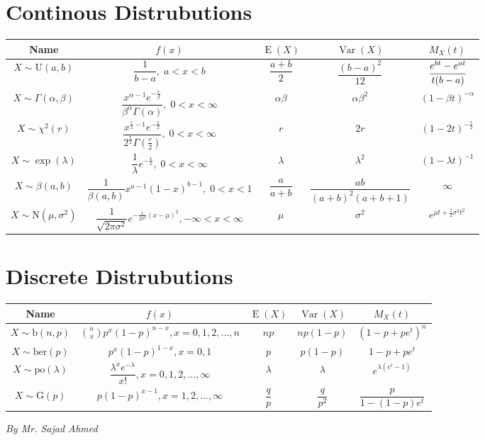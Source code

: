 \documentclass[14pt]{extarticle}
\DeclareMathOperator{\E}{E}
\DeclareMathOperator{\Var}{Var}
\begin{document}
\pagestyle{empty}
\section*{Continous Distrubutions}
\begin{center}
\begin{tabular}{|c|c|c|c|c|}
	\hline 
	Name & \(f(x)\) & \(\E(X)\) & \(\Var(X)\) & \(M_X(t)\) \\
	\hline
	\(X \sim \text{U}(a, b)\) & \(\dfrac{1}{b-a}, \; a < x < b\) & \(\dfrac{a+b}{2}\) & \(\dfrac{(b-a)^2}{12}\) & \(\cfrac{e^{bt} - e^{at}}{t(b-a)}\)\\
	\hline 
	\(X\sim \Gamma(\alpha, \beta)\) & \(\dfrac{x^{\alpha-1}e^{-\frac{x}{\beta}}}{\beta^\alpha \Gamma(\alpha)}, \; 0<x<\infty\) & \(\alpha\beta\) & \(\alpha\beta^2\) & \((1-\beta t)^{-\alpha}\) \\
	\hline
	\(X\sim \chi^2(r)\) & \(\dfrac{x^{\frac{r}{2}-1}e^{-\frac{x}{2}}}{2^{\frac{r}{2}}\Gamma(\frac{r}{2})}, \; 0<x<\infty\) & \(r\) & \(2r\) & \((1-2t)^{-\frac{r}{2}}\)\\
	\hline
	\(X\sim \exp(\lambda)\) & \(\dfrac{1}{\lambda} e^{-\frac{x}{\lambda}}, \; 0<x<\infty\) & \(\lambda\) & \(\lambda^2\) & \((1-\lambda t)^{-1}\)\\
	\hline
	\(X\sim \beta(a, b)\) & \(\dfrac{1}{\beta(a, b)} x^{a-1}(1-x)^{b-1}, \; 0<x<1\) & \(\dfrac{a}{a+b}\) & \(\dfrac{ab}{(a+b)^2(a+b+1)}\) & \(\infty\) \\
	\hline
	\(X\sim \text{N}(\mu, \sigma^2)\) & \(\dfrac{1}{\sqrt{2\pi \sigma^2}} e^{-\frac{1}{2\sigma^2}(x-\mu)^2}, -\infty<x<\infty\) & \(\mu\) & \(\sigma^2\) & \(e^{\mu t + \frac{1}{2} \sigma^2 t^2}\) \\ \hline
\end{tabular}
\end{center}

\section*{Discrete Distrubutions}
\begin{center}
	\begin{tabular}{|c|c|c|c|c|}
		\hline
		Name & \(f(x)\) & \(\E(X)\) & \(\Var(X)\) & \(M_X(t)\) \\
		\hline
		\(X\sim \text{b}(n,p)\) & \(\displaystyle\binom{n}{x}p^x(1-p)^{n-x}, x=0,1,2,\dots,n\) & \(np\) & \(np(1-p)\) & \((1-p + pe^t)^n\)\\
		\hline
		\(X\sim \text{ber}(p)\) & \(p^x(1-p)^{1-x}, x=0,1\) & \(p\) & \(p(1-p)\) & \(1-p+pe^t\) \\
		\hline
		\(X\sim \text{po}(\lambda)\) & \(\dfrac{\lambda^x e^{-\lambda}}{x !}, x=0,1,2,\dots,\infty\) & \(\lambda\) & \(\lambda\) & \(e^{\lambda(e^t - 1)}\)\\
		\hline
		\(X\sim \text{G}(p)\) & \(p(1-p)^{x-1}, x=1,2,\dots,\infty\) & \(\dfrac{q}{p}\) & \(\dfrac{q}{p^2}\) & \(\dfrac{p}{1-(1-p)e^t}\)\\
		\hline
	\end{tabular}
\end{center}
\textit{By Mr. Sajad Ahmed}
\end{document}
